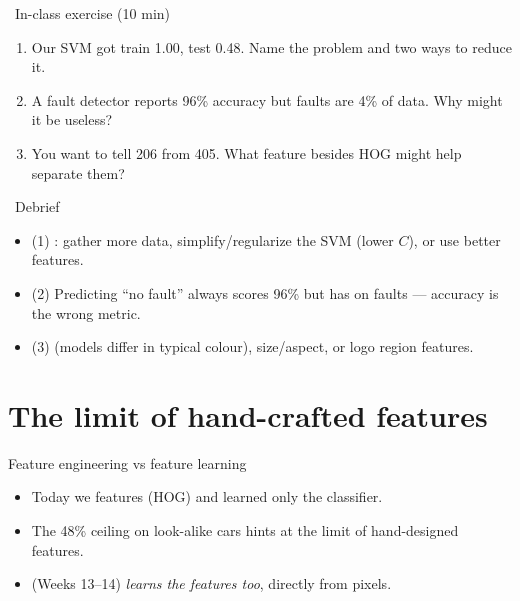 \documentclass[10pt,aspectratio=169]{beamer}
\begin{document}
\begin{frame}{\faPen~In-class exercise (10 min)}
  \begin{infobox}
  \end{infobox}
  \begin{enumerate}
    \item Our SVM got train 1.00, test 0.48. Name the problem and two ways to reduce it.
    \item A fault detector reports 96\% accuracy but faults are 4\% of data. Why might it be useless?
    \item You want to tell 206 from 405. What feature besides HOG might help separate them?
  \end{enumerate}
\end{frame}

\begin{frame}{\faPen~Debrief}
  \begin{itemize}
    \item (1) : gather more data, simplify/regularize the SVM (lower $C$), or use better features.
    \item (2) Predicting ``no fault'' always scores 96\% but has  on faults — accuracy is the wrong metric.
    \item (3)  (models differ in typical colour), size/aspect, or logo region features.
  \end{itemize}
\end{frame}

\section{The limit of hand-crafted features}

\begin{frame}{Feature engineering vs feature learning}
  \begin{itemize}
    \item Today we  features (HOG) and learned only the classifier.
    \item The 48\% ceiling on look-alike cars hints at the limit of hand-designed features.
    \item {} (Weeks 13--14) \emph{learns the features too}, directly from pixels.
  \end{itemize}
\end{frame}
\end{document}
